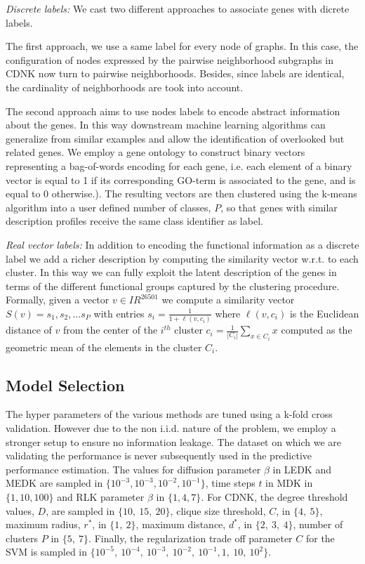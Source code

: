 \documentclass[review]{elsarticle}
\begin{document}
\textit{Discrete labels:} We cast two different approaches to associate genes with dicrete labels.

The first approach, we use a same label for every node of graphs. In this case, the configuration of nodes expressed by the pairwise neighborhood subgraphs in CDNK now turn to pairwise neighborhoods. Besides, since labels are identical, the cardinality of neighborhoods are took into account.

The second approach aims to use nodes labels to encode abstract information about the genes. In this way downstream machine learning algorithms can generalize from similar examples and allow the identification of overlooked but related genes. We employ a gene ontology \cite{gene2004gene} to construct binary vectors representing a bag-of-words encoding for each gene, i.e. each element of a binary vector is equal to 1 if its corresponding GO-term is associated to the gene, and is equal to 0 otherwise.). The resulting vectors are then clustered using the k-means algorithm into a user defined number of classes, $P$, so that genes with similar description profiles receive the same class identifier as label.

\textit{Real vector labels:} In addition to encoding the functional information as a discrete label we add a richer description by computing the similarity vector w.r.t. to each cluster. In this way we can fully exploit the latent description of the genes in terms of the different functional groups captured by the clustering procedure. Formally, given a vector $v \in I\!R^{26501}$ we compute a similarity vector $S(v)= {s_1, s_2, \ldots s_P}$ with entries $s_i = \frac{1}{1+ \ell(v,c_i)}$ where $\ell(v,c_i)$ is the Euclidean distance of $v$ from the center of the $i^{th}$ cluster $c_i = \frac{1}{|C_i|}\sum_{x \in C_i} x$ computed as the geometric mean of the elements in the cluster $C_i$.

\subsection{Model Selection}
The hyper parameters of the various methods are tuned using a k-fold cross validation. However due to the non i.i.d. nature of the problem, we employ a stronger setup to ensure no information leakage. The dataset on which we are validating the performance is never subsequently used in the predictive performance estimation. The values for diffusion parameter $\beta$ in LEDK and MEDK are sampled in $\lbrace 10^{-3}, 10^{-3}, 10^{-2}, 10^{-1} \rbrace$, time steps $t$ in MDK in $\lbrace 1, 10, 100 \rbrace$ and RLK parameter $\beta$ in $\lbrace 1, 4, 7 \rbrace$. For CDNK, the degree threshold values, $D$, are sampled in $\lbrace 10,\ 15,\ 20 \rbrace$, clique size threshold, $C$, in $\lbrace 4,\ 5 \rbrace$, maximum radius, $r^*$, in $\lbrace 1,\ 2 \rbrace$, maximum distance, $d^*$, in $\lbrace 2,\ 3,\ 4 \rbrace$, number of clusters $P$ in $\lbrace 5,\ 7 \rbrace$. Finally, the regularization trade off parameter $C$ for the SVM is sampled in $\lbrace 10^{-5},  \ 10^{-4}, \ 10^{-3},\ 10^{-2},\ 10^{-1}, 1,\ 10,\ 10^2 \rbrace$.
\end{document}
